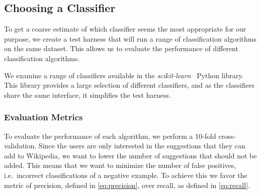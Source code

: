 
\subsection{Choosing a Classifier}\label{choosing_classifier}
To get a coarse estimate of which classifier seems the most appropriate for our purpose, we create a test harness that will run a range of classification algorithms on the same dataset. This allows us to evaluate the performance of different classification algorithms.

We examine a range of classifiers available in the \emph{scikit-learn}~\cite{scikit-learn} Python library. This library provides a large selection of different classifiers, and as the classifiers share the same interface, it simplifies the test harness.

\subsubsection{Evaluation Metrics}\label{evaluation_metric}
To evaluate the performance of each algorithm, we perform a 10-fold cross-validation. Since the users are only interested in the suggestions that they can add to Wikipedia, we want to lower the number of suggestions that should not be added. This means that we want to minimize the number of false positives, i.e.\ incorrect classifications of a negative example. To achieve this we favor the metric of precision, defined in \cref{eq:precision}, over recall, as defined in \cref{eq:recall}.

